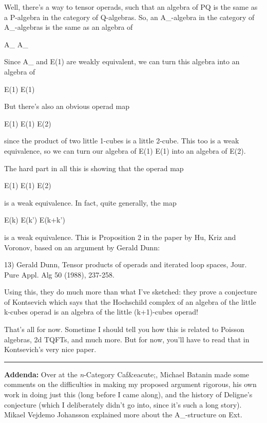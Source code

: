 Well, there's a way to tensor operads, such that an algebra of P\otimes Q 
is the same as a P-algebra in the category of Q-algebras.  So, an 
A_{\infty }-algebra in the category of A_{\infty }-algebras is
the same as an algebra of

A_{\infty } \otimes  A_{\infty }

Since A_{\infty } and E(1) are weakly equivalent, we can turn this
algebra into an algebra of 

E(1) \otimes  E(1)

But there's also an obvious operad map

E(1) \otimes  E(1) \to  E(2)

since the product of two little 1-cubes is a little 2-cube.
This too is a weak equivalence, so we can turn our algebra of
E(1) \otimes  E(1) into an algebra of E(2).

The hard part in all this is showing that the operad map

E(1) \otimes  E(1) \to  E(2)

is a weak equivalence.  In fact, quite generally, the map

E(k) \otimes  E(k') \to  E(k+k') 

is a weak equivalence.  This is Proposition 2 in the paper by
Hu, Kriz and Voronov, based on an argument by Gerald Dunn:

13) Gerald Dunn, Tensor products of operads and iterated loop
spaces, Jour. Pure Appl. Alg 50 (1988), 237-258.

Using this, they do much more than what I've sketched: they
prove a conjecture of Kontsevich which says that the Hochschild 
complex of an algebra of the little k-cubes
operad is an algebra of the little (k+1)-cubes operad!

That's all for now.  Sometime I should tell you how this is related
to Poisson algebras, 2d TQFTs, and much more.  But for now, you'll
have to read that in Kontsevich's very nice paper.

\par\noindent\rule{\textwidth}{0.4pt}

\textbf{Addenda:} 
Over at the \emph{n}-Category Caf&eacute;, 
Michael Batanin made some comments on the
difficulties in making my proposed argument rigorous, his own work in
doing just this (long before I came along), and the history of Deligne's
conjecture (which I deliberately didn't go into, since it's such a
long story).  Mikael Vejdemo Johansson explained more about the
A_{\infty }-structure on Ext.

